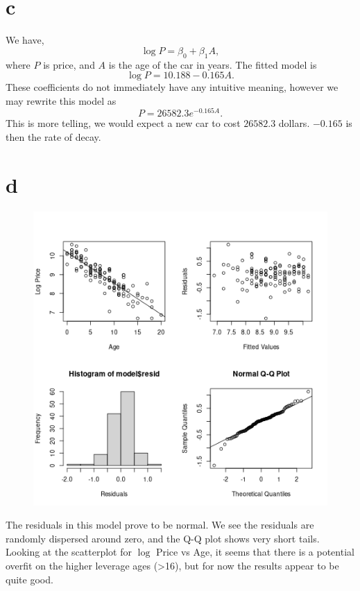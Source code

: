 \documentclass[a4paper]{article}
\begin{document}
\section*{c}%
\label{sec:c}
We have,
\begin{equation*}
	\log P = \beta_0 + \beta_1 A,
\end{equation*}
where \(P\) is price, and \(A\) is the age of the car in years. The fitted model is
\begin{equation*}
	\log P = 10.188 -0.165A.
\end{equation*}
These coefficients do not immediately have any intuitive meaning, however we may rewrite this model as 
\begin{equation*}
	P = 26582.3 e^{-0.165A}.
\end{equation*}
This is more telling, we would expect a new car to cost \(26582.3\) dollars. \(-0.165\) is then the rate of decay.

\section*{d}%
\label{sec:d}
\begin{figure}[H]
	\centering
	\includegraphics[width=\textwidth]{"../logPvA.png"}
\end{figure}
The residuals in this model prove to be normal. We see the residuals are randomly dispersed around zero, and the Q-Q plot shows very short tails. Looking at the scatterplot for \(\log\) Price vs Age, it seems that there is a potential overfit on the higher leverage ages (>16), but for now the results appear to be quite good.
\end{document}
